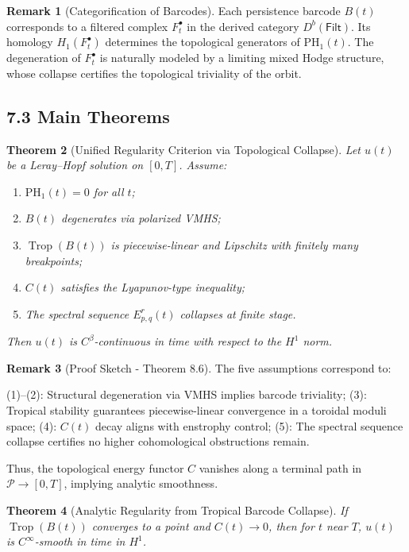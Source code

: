 \documentclass[11pt]{article}
\newtheorem{theorem}{Theorem}[section]
\theoremstyle{definition}
\newtheorem{remark}[theorem]{Remark}
\begin{document}
\begin{remark}[Categorification of Barcodes]
Each persistence barcode $B(t)$ corresponds to a filtered complex $F^\bullet_t$ in the derived category $D^b(\mathsf{Filt})$. Its homology $H_1(F^\bullet_t)$ determines the topological generators of $\mathrm{PH}_1(t)$. The degeneration of $F^\bullet_t$ is naturally modeled by a limiting mixed Hodge structure, whose collapse certifies the topological triviality of the orbit.
\end{remark}

\subsection*{7.3 Main Theorems}

\begin{theorem}[Unified Regularity Criterion via Topological Collapse]
Let $u(t)$ be a Leray--Hopf solution on $[0,T]$. Assume:
\begin{enumerate}
  \item $\mathrm{PH}_1(t) = 0$ for all $t$;
  \item $B(t)$ degenerates via polarized VMHS;
  \item $\operatorname{Trop}(B(t))$ is piecewise-linear and Lipschitz with finitely many breakpoints;
  \item $C(t)$ satisfies the Lyapunov-type inequality;
  \item The spectral sequence $E^r_{p,q}(t)$ collapses at finite stage.
\end{enumerate}
Then $u(t)$ is $C^\beta$-continuous in time with respect to the $H^1$ norm.
\end{theorem}

\begin{remark}[Proof Sketch - Theorem 8.6]
The five assumptions correspond to:

(1)–(2): Structural degeneration via VMHS implies barcode triviality;
(3): Tropical stability guarantees piecewise-linear convergence in a toroidal moduli space;
(4): $C(t)$ decay aligns with enstrophy control;
(5): The spectral sequence collapse certifies no higher cohomological obstructions remain.

Thus, the topological energy functor $C$ vanishes along a terminal path in $\mathcal{P} \to [0,T]$, implying analytic smoothness.
\end{remark}

\begin{theorem}[Analytic Regularity from Tropical Barcode Collapse]
If $\operatorname{Trop}(B(t))$ converges to a point and $C(t) \to 0$, then for $t$ near $T$, $u(t)$ is $C^\infty$-smooth in time in $H^1$.
\end{theorem}
\end{document}
